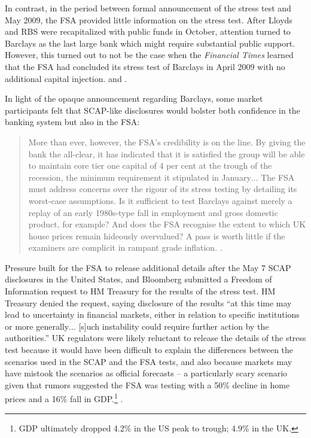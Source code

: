 \documentclass[12pt]{article}
\begin{document}
In contrast, in the period between formal announcement of the stress test and May 2009, the FSA provided little information on the stress test. After Lloyds and RBS were recapitalized with public funds in October, attention turned to Barclays as the last large bank which might require substantial public support. However, this turned out to not be the case when the \textit{Financial Times} learned that the FSA had concluded its stress test of Barclays in April 2009 with no additional capital injection. \citep{Barclays1} and \citep{Lex}.

In light of the opaque announcement regarding Barclays, some market participants felt that SCAP-like disclosures would bolster both confidence in the banking system but also in the FSA:

\begin{quote}
 More than ever, however, the FSA's credibility is on the line. By giving the bank the all-clear, it has indicated that it is satisfied the group will be able to maintain core tier one capital of 4 per cent at the trough of the recession, the minimum requirement it stipulated in January$\dots$ The FSA must address concerns over the rigour of its stress testing by detailing its worst-case assumptions. Is it sufficient to test Barclays against merely a replay of an early 1980s-type fall in employment and gross domestic product, for example? And does the FSA recognise the extent to which UK house prices remain hideously overvalued? A pass is worth little if the examiners are complicit in rampant grade inflation. \citep{Lex}.
\end{quote}

Pressure built for the FSA to release additional details after the May 7 SCAP disclosures in the United States, and Bloomberg submitted a Freedom of Information request to HM Treasury for the results of the stress test. HM Treasury denied the request, saying disclosure of the results ``at this time may lead to uncertainty in financial markets, either in relation to specific institutions or more generally$\dots$ [s]uch instability could require further action by the authorities.'' UK regulators were likely reluctant to release the details of the stress test because it would have been difficult to explain the differences between the scenarios used in the SCAP and the FSA tests, and also because markets may have mistook the scenarios as official forecasts -- a particularly scary scenario given that rumors suggested the FSA was testing with a 50\% decline in home prices and a 16\% fall in GDP.\footnote{GDP ultimately dropped 4.2\% in the US peak to trough; 4.9\% in the UK.} \citep{Murphy}.
\end{document}
